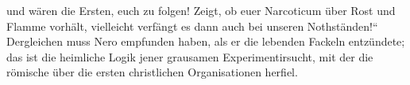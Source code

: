 und wären die Ersten, euch zu folgen! Zeigt, ob euer Narcoticum über Rost und Flamme vorhält, vielleicht verfängt es dann auch bei unseren Nothständen!“ Dergleichen muss Nero empfunden haben, als er die lebenden Fackeln entzündete; das ist die heimliche Logik jener grausamen Experimentirsucht, mit der die römische  über die ersten christlichen Organisationen herfiel.
\par

